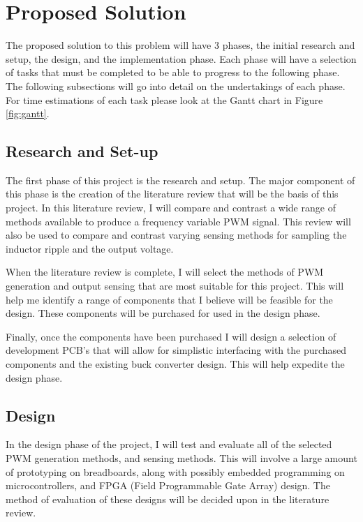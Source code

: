 \documentclass[11pt, a4paper, oneside]{report}
\begin{document}
\section{Proposed Solution}

The proposed solution to this problem will have 3 phases, the initial research and setup, the design, and the implementation phase. Each phase will have a selection of tasks that must be completed to be able to progress to the following phase. The following subsections will go into detail on the undertakings of each phase. For time estimations of each task please look at the Gantt chart in Figure \ref{fig:gantt}.

\subsection{Research and Set-up}

The first phase of this project is the research and setup. The major component of this phase is the creation of the literature review that will be the basis of this project. In this literature review, I will compare and contrast a wide range of methods available to produce a frequency variable PWM signal. This review will also be used to compare and contrast varying sensing methods for sampling the inductor ripple and the output voltage.

When the literature review is complete, I will select the methods of PWM generation and output sensing that are most suitable for this project. This will help me identify a range of components that I believe will be feasible for the design. These components will be purchased for used in the design phase.

Finally, once the components have been purchased I will design a selection of development PCB's that will allow for simplistic interfacing with the purchased components and the existing buck converter design. This will help expedite the design phase.

\subsection{Design}
\label{sec:design}

In the design phase of the project, I will test and evaluate all of the selected PWM generation methods, and sensing methods. This will involve a large amount of prototyping on breadboards, along with possibly embedded programming on microcontrollers, and FPGA (Field Programmable Gate Array) design. The method of evaluation of these designs will be decided upon in the literature review.
\end{document}
